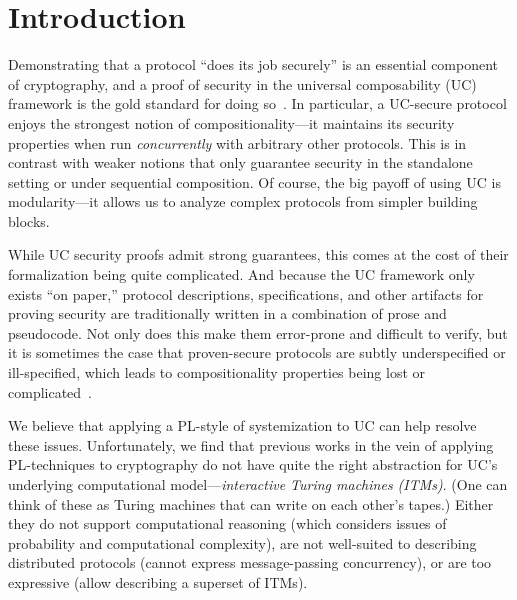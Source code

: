 \section{Introduction}
\label{sec:introduction}

Demonstrating that a protocol ``does its job securely'' is an essential
component of cryptography, and a proof of security in the universal
composability (UC) framework is the gold standard for doing
so~\cite{canetti2001universally}. In particular, a UC-secure protocol enjoys the
strongest notion of compositionality---it maintains its security properties when
run \emph{concurrently} with arbitrary other protocols. This is in contrast with
weaker notions that only guarantee security in the standalone setting or under
sequential composition. Of course, the big payoff of using UC is modularity---it
allows us to analyze complex protocols from simpler building blocks.

\begin{comment}
In a nutshell, security proofs in UC follow the real/ideal
paradigm~\cite{goldreich1987play}. The security requirements of a given task are
defined as a program for a \emph{single trusted process} called an \emph{ideal
  functionality}, which runs in an imagined ideal world. This serves as a
specification of the desired security properties for a distributed protocol
achieving the task across \emph{many unstrusted processes}, which runs in the
real world. Roughly speaking, we say that a protocol $\pi$ \emph{emulates} an
ideal functionality $\mc{F}$ (i.e., it meets its specification) if every
adversarial behavior in the real world can also be exhibited in the ideal world.
\end{comment}

While UC security proofs admit strong guarantees, this comes at the cost of
their formalization being quite complicated. And because the UC framework only
exists ``on paper,'' protocol descriptions, specifications, and other artifacts
for proving security are traditionally written in a combination of prose and
pseudocode. Not only does this make them error-prone and difficult to verify,
but it is sometimes the case that proven-secure protocols are subtly
underspecified or ill-specified, which leads to compositionality properties
being lost or complicated~\cite{camenisch2016universal}.

We believe that applying a PL-style of systemization to UC can help resolve
these issues. Unfortunately, we find that previous works in the vein of applying
PL-techniques to cryptography do not have quite the right abstraction for UC's
underlying computational model---\emph{interactive Turing machines (ITMs)}. (One
can think of these as Turing machines that can write on each other's
tapes.) Either they do not support computational reasoning (which considers
issues of probability and computational complexity), are not well-suited to
describing distributed protocols (cannot express message-passing concurrency),
or are too expressive (allow describing a superset of ITMs).


